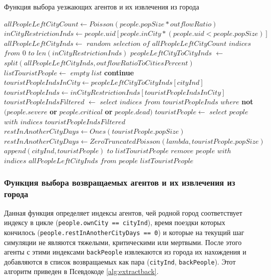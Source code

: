 \documentclass[a4paper,12pt]{article} %
\begin{document}
\begin{algorithm}[H]
\caption{Функция выбора уезжающих агентов и их извлечения из города}
\label{alg:extracttourists}
\begin{algorithmic}[1]
	\State \( allPeopleLeftCityCount \gets Poisson(people.popSize * outflowRatio) \)
	\State \( inCityRestrictionInds \gets people.uid[people.inCity * (people.uid < people.popSize)]\)
	\State \( allPeopleLeftCityInds \gets \) \(random\) \(selection\) \(of\) \(allPeopleLeftCityCount\) \(indices\) \(from\) \(0\) \(to\) \(len(inCityRestrictionInds)\)
	\State \( peopleLeftCityToCityInds \) \(\gets\) \(split(allPeopleLeftCityInds,outflowRatioToCitiesPercent) \)
	\State \( listTouristPeople \gets\) \(empty\) \(list \)
			\State \textbf{continue}
		\EndIf
		\State \( touristPeopleIndsInCity \gets peopleLeftCityToCityInds[cityInd] \)
		\State \( touristPeopleInds \gets inCityRestrictionInds[touristPeopleIndsInCity] \)
		\State \( touristPeopleIndsFiltered\) \( \gets \) \( select \) \( indices \) \( from \) \( touristPeopleInds \) \( where \) \textbf{not} \( (people.severe \) \textbf{or} \( people.critical \) \textbf{or} \( people.dead) \)
		\State \( touristPeople \gets \) \(select\) \(people\) \(with\) \(indices\) \(touristPeopleIndsFiltered \)
			\State \( restInAnotherCityDays \gets Ones(touristPeople.popSize) \)
		\Else
			\State \( restInAnotherCityDays \gets ZeroTruncatedPoisson(lambda, touristPeople.popSize) \)
		\EndIf
		\State \( append(cityInd, touristPeople) \) \(to\) \(listTouristPeople \)
	\EndFor
	\State \(remove\) \(people\) \(with\) \(indices\) \(allPeopleLeftCityInds\) \(from\) \(people \)
	\State \Return \( listTouristPeople \)	
\EndFunction	
\end{algorithmic}
\end{algorithm}


\subsubsection{Функция выбора возвращаемых агентов и их извлечения из города}

Данная функция определяет индексы агентов, чей родной город соответствует индексу в цикле (\texttt{people.ownCity == cityInd}), время поездки которых кончилось (\texttt{people.restInAnotherCityDays == 0}) и которые на текущий шаг симуляции не являются тяжелыми, критическими или мертвыми. После этого агенты с этими индексами \texttt{backPeople} извлекаются из города их нахождения и добавляются в список возвращаемых как пара (\texttt{cityInd}, \texttt{backPeople}). Этот алгоритм приведен в Псевдокоде \ref{alg:extractback}.
\end{document}
